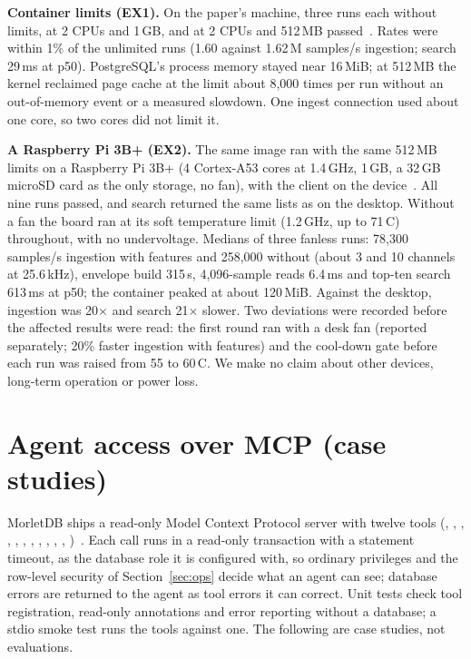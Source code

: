 \documentclass[sigconf,nonacm]{acmart}
\newcommand{\M}{MorletDB}
\begin{document}
\textbf{Container limits (EX1).} On the paper's machine, three runs each without limits, at 2 CPUs and 1\,GB, and at 2 CPUs and 512\,MB passed~\cite{ex1}. Rates were within 1\% of the unlimited runs (1.60 against 1.62\,M samples/s ingestion; search 29\,ms at p50). PostgreSQL's process memory stayed near 16\,MiB; at 512\,MB the kernel reclaimed page cache at the limit about 8,000 times per run without an out-of-memory event or a measured slowdown. One ingest connection used about one core, so two cores did not limit it.

\textbf{A Raspberry Pi 3B+ (EX2).} The same image ran with the same 512\,MB limits on a Raspberry Pi 3B+ (4 Cortex-A53 cores at 1.4\,GHz, 1\,GB, a 32\,GB microSD card as the only storage, no fan), with the client on the device~\cite{ex2}. All nine runs passed, and search returned the same lists as on the desktop. Without a fan the board ran at its soft temperature limit (1.2\,GHz, up to 71\,\textdegree C) throughout, with no undervoltage. Medians of three fanless runs: 78,300 samples/s ingestion with features and 258,000 without (about 3 and 10 channels at 25.6\,kHz), envelope build 315\,s, 4,096-sample reads 6.4\,ms and top-ten search 613\,ms at p50; the container peaked at about 120\,MiB. Against the desktop, ingestion was 20$\times$ and search 21$\times$ slower. Two deviations were recorded before the affected results were read: the first round ran with a desk fan (reported separately; 20\% faster ingestion with features) and the cool-down gate before each run was raised from 55 to 60\,\textdegree C. We make no claim about other devices, long-term operation or power loss.

\section{Agent access over MCP (case studies)}\label{sec:mcp}
\M{} ships a read-only Model Context Protocol server with twelve tools (, , , , , , , , , , , )~\cite{mcp}. Each call runs in a read-only transaction with a statement timeout, as the database role it is configured with, so ordinary privileges and the row-level security of Section~\ref{sec:ops} decide what an agent can see; database errors are returned to the agent as tool errors it can correct. Unit tests check tool registration, read-only annotations and error reporting without a database; a stdio smoke test runs the tools against one. The following are case studies, not evaluations.
\end{document}
